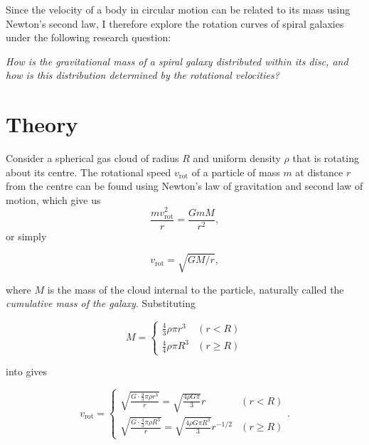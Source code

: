 \documentclass{article}
\newcommand\vrot{\ensuremath{v_{\textrm{rot}}}}
\begin{document}
Since the velocity of a body in circular motion can be related to its mass using Newton's second law, I therefore explore the rotation curves of spiral galaxies under the following research question:

\begin{center}
    \textit{How is the gravitational mass of a spiral galaxy distributed within its disc, and how is this distribution determined by the rotational velocities?}
\end{center}

\section{Theory}\label{sec:theory}

Consider a spherical gas cloud of radius \(R\) and uniform density \(\rho\) that is rotating about its centre.
The rotational speed \(v_{\text{rot}}\) of a particle of mass \(m\) at distance \(r\) from the centre can be found using Newton's law of gravitation and second law of motion, which give us
\[\frac{mv_{\text{rot}}^2}{r} = \frac{GmM}{r^2},\]
or simply

\begin{equation}
    v_{\text{rot}} = \sqrt{GM/r},
    \label{eq:vrotcummass}
\end{equation}

where \(M\) is the mass of the cloud internal to the particle, naturally called the \textit{cumulative mass of the galaxy}.
Substituting

\begin{equation}\label{eq:massdense}
    M =
    \begin{cases}
        \frac{4}{3}\rho\pi r^3 & (r < R) \\
        \frac{4}{4}\rho\pi R^3 & (r \ge R)
    \end{cases}
\end{equation}

into  gives

\begin{equation}\label{eq:vrotdense}
    \vrot = 
    \begin{cases}
        \sqrt{\frac{G\cdot \frac 4 3 \pi \rho r^3}{r}} = \sqrt{\frac{4\rho G\pi}{3}} r & (r < R) \\
        \sqrt{\frac{G\cdot \frac 4 3 \pi \rho R^3}{r}} = \sqrt{\frac{4\rho G\pi R^3}{3}} r^{-1/2} & (r \ge R)
    \end{cases}.
\end{equation}
\end{document}
